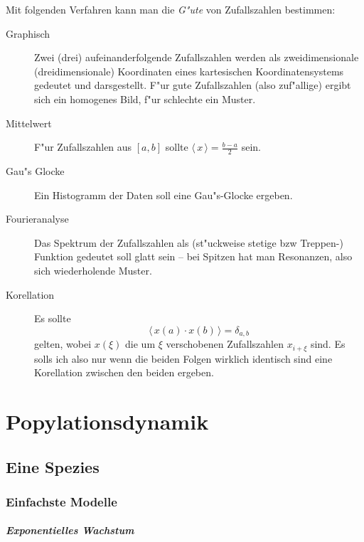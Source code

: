 \documentclass[a4paper]{book}
\newcommand{\mittel}[1]{\ensuremath{\langle  \, #1 \,  \rangle}}
\begin{document}
Mit folgenden Verfahren kann man die \emph{G"ute} von Zufallszahlen
bestimmen:
\begin{description}
\item[Graphisch] Zwei (drei) aufeinanderfolgende Zufallszahlen werden
  als zweidimensionale (dreidimensionale) Koordinaten eines
  kartesischen Koordinatensystems gedeutet und darsgestellt. F"ur gute
  Zufallszahlen (also zuf"allige) ergibt sich ein homogenes Bild, f"ur
  schlechte ein Muster.
\item[Mittelwert] F"ur Zufallszahlen aus $[a,b]$ sollte $\mittel x =
  \frac{b-a}{2}$ sein.
\item[Gau"s Glocke] Ein Histogramm der Daten soll eine Gau"s-Glocke ergeben.
\item[Fourieranalyse] Das Spektrum der Zufallszahlen als (st"uckweise
  stetige bzw Treppen-) Funktion gedeutet soll glatt sein -- bei
  Spitzen hat man Resonanzen, also sich wiederholende Muster.
\item[Korellation] Es sollte
  \begin{equation}
    \label{eq:91}
    \mittel{ x(a) \cdot x(b) } = \delta_{a,b}
  \end{equation}
gelten, wobei $x(\xi)$ die um $\xi$ verschobenen Zufallszahlen $x_{i +
  \xi}$ sind. Es solls ich also nur wenn die beiden Folgen wirklich
identisch sind eine Korellation zwischen den beiden ergeben.
\end{description}








\chapter{Popylationsdynamik}
\label{cha:popylationsdynamik}


\section{Eine Spezies}
\label{sec:eine_spezies}


\subsection{Einfachste Modelle}
\label{sec:einfachste_modelle}


\paragraph{Exponentielles Wachstum}
\label{sec:exponentielles_wachstum}
\end{document}
